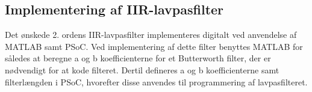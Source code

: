 \subsection{Implementering af IIR-lavpasfilter}
Det ønskede 2. ordens IIR-lavpasfilter implementeres digitalt ved anvendelse af MATLAB samt PSoC.
Ved implementering af dette filter benyttes MATLAB for således at beregne a og b koefficienterne for et Butterworth filter, der er nødvendigt for at kode filteret. Dertil defineres a og b koefficienterne samt filterlængden i PSoC, hvorefter disse anvendes til programmering af lavpasfilteret. 

